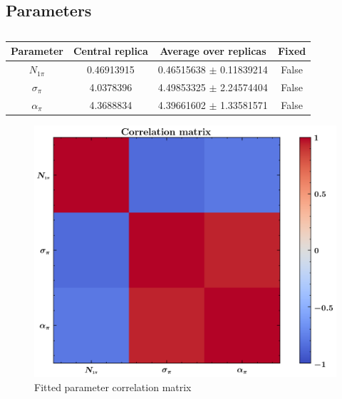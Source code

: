 \documentclass[]{article}
\begin{document}
\hypertarget{parameters}{%
\subsection{Parameters}\label{parameters}}

\begin{table}[h]

\centering

\begin{tabular}{|c|c|c|c|} \hline

\textbf{Parameter} & \textbf{Central replica} & \textbf{Average over
replicas} & \textbf{Fixed} \\ \hline

\(N_{1\pi}\) & 0.46913915 & 0.46515638 \(\pm\)
0.11839214 & False \\ \hline
\(\sigma_\pi\) & 4.0378396 & 4.49853325 \(\pm\)
2.24574404 & False \\ \hline
\(\alpha_\pi\) & 4.3688834 & 4.39661602 \(\pm\)
1.33581571 & False \\ \hline

\end{tabular}

\caption{}

\end{table}

\begin{figure}
\centering
\includegraphics{pngplots/CorrelationMatrix.png}
\caption{Fitted parameter correlation matrix}
\end{figure}
\end{document}
